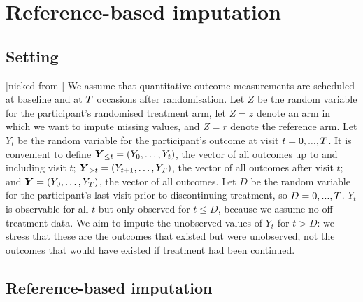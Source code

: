 
\section{Reference-based imputation}

\subsection{Setting} [nicked from \citet{ian:RBIcausal}]
We assume that quantitative outcome measurements are scheduled at baseline and at $T$ occasions after randomisation. 
Let $Z$ be the random variable for the participant's randomised treatment arm, let $Z=z$ denote an arm in which we want to impute missing values, and $Z=r$ denote the reference arm.
Let $Y_t$ be the random variable for the participant's outcome at visit $t=0,...,T$. 
It is convenient to define 
$\boldsymbol{Y}_{{\le{t}}}=(Y_0,\ldots,Y_t)$, the vector of all outcomes up to  and including visit $t$; 
$\boldsymbol{Y}_{{>t}}=(Y_{t+1},\ldots,Y_T)$, the vector of all outcomes after visit $t$; 
and
$\boldsymbol{Y}=(Y_0,\ldots,Y_T)$, the vector of all outcomes.
Let $D$ be the random variable for the participant's last visit prior to discontinuing treatment, so $D=0,...,T$.
$Y_t$ is observable for all $t$ but only observed for $t \le D$, because we assume no off-treatment data. 
We aim to impute the unobserved values of $Y_t$ for $t>D$: we stress that these are the outcomes that existed but were unobserved, not the outcomes that would have existed if treatment had been continued.


\subsection{Reference-based imputation}

